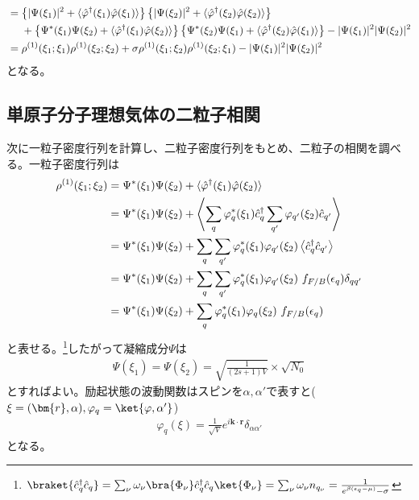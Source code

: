 \documentclass[dvipdfmx, 11pt, a4paper]{jsarticle}
\numberwithin{equation}{section}
\theoremstyle{definition}
\begin{document}
\begin{derivationBox}
\begin{align}
            &=\left\{ |\Psi(\xi_1)|^2 + \langle \hat{\varphi}^\dagger(\xi_1) \hat{\varphi}(\xi_1)\rangle  \right\} \left\{ |\Psi(\xi_2)|^2 + \langle \hat{\varphi}^\dagger(\xi_2) \hat{\varphi}(\xi_2)\rangle  \right\} \notag \\
            &\ \ \ \ + \left\{ \Psi^* (\xi_1) \Psi(\xi_2) +\langle \hat{\varphi}^\dagger(\xi_1) \hat{\varphi}(\xi_2)\rangle  \right\}\left\{ \Psi^* (\xi_2) \Psi(\xi_1) +\langle \hat{\varphi}^\dagger(\xi_2) \hat{\varphi}(\xi_1)\rangle  \right\}- |\Psi (\xi_1)|^2 |\Psi (\xi_2)|^2 \notag \\
            &= \rho^{(1)}(\xi_1;\xi_1) \rho^{(1)}(\xi_2;\xi_2) + \sigma \rho^{(1)}(\xi_1;\xi_2) \rho^{(1)}(\xi_2;\xi_1) - |\Psi (\xi_1)|^2 |\Psi (\xi_2)|^2 
        \end{align}
        となる。
    \end{derivationBox}
\subsection{単原子分子理想気体の二粒子相関}
    次に一粒子密度行列を計算し、二粒子密度行列をもとめ、二粒子の相関を調べる。一粒子密度行列は
    \begin{align}
        \rho^{(1)}(\xi_1;\xi_2) 
            &= \Psi^* (\xi_1) \Psi(\xi_2) + \langle \hat{\varphi}^\dagger(\xi_1) \hat{\varphi}(\xi_2)\rangle  \notag \\
            &= \Psi^* (\xi_1) \Psi(\xi_2) + \left\langle \sum_q \varphi_q^* (\xi_1) \hat{c}_q^\dagger \sum_{q'} \varphi_{q'} (\xi_2) \hat{c}_{q'}\right\rangle \notag \\
            &= \Psi^* (\xi_1) \Psi(\xi_2) + \sum_q \sum_{q'} \varphi_q^* (\xi_1)\varphi_{q'} (\xi_2) \left\langle  \hat{c}_q^\dagger  \hat{c}_{q'}\right\rangle \notag \\
            &= \Psi^* (\xi_1) \Psi(\xi_2) + \sum_q \sum_{q'} \varphi_q^* (\xi_1)\varphi_{q'} (\xi_2)\ f_{F/B} (\epsilon_q) \delta_{qq'} \notag \\
            &= \Psi^* (\xi_1) \Psi(\xi_2) + \sum_q \varphi_q^* (\xi_1)\varphi_{q} (\xi_2)\ f_{F/B} (\epsilon_q) 
    \end{align}
    と表せる。\footnote{$\braket{\hat{c}^\dagger_q \hat{c}_q} = \sum_\nu \omega_\nu \bra{\Phi_\nu} \hat{c}^\dagger_q \hat{c}_q \ket{\Phi_\nu } = \sum_\nu \omega_\nu n_{q_\nu} = \frac{1}{e^{\beta(\epsilon_q-\mu)}-\sigma}$}したがって凝縮成分$\Psi$は
    \begin{align}
        \Psi(\xi_1) = \Psi (\xi_2) = \sqrt{\frac{1}{(2s+1)V}} \times \sqrt{N_0}
    \end{align}
    とすればよい。励起状態の波動関数はスピンを$\alpha,\alpha'で表すと$($\xi = (\bm{r},\alpha),\varphi_q = \ket{\varphi,\alpha'}$)
    \begin{align}
        \varphi_q (\xi) = \frac{1}{\sqrt{V}} e^{i\bm{k}\cdot \bm{r}}\delta_{\alpha \alpha'}
    \end{align}
    となる。
    
\end{document}
